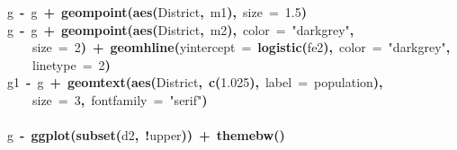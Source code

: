 \documentclass{article}
\makeatletter
\newcommand{\hlnumber}[1]{\textcolor[rgb]{0,0,0}{#1}}%
\newcommand{\hlfunctioncall}[1]{\textcolor[rgb]{.5,0,.33}{\textbf{#1}}}%
\newcommand{\hlstring}[1]{\textcolor[rgb]{.6,.6,1}{#1}}%
\newcommand{\hlkeyword}[1]{\textbf{#1}}%
\newcommand{\hlargument}[1]{\textcolor[rgb]{.69,.25,.02}{#1}}%
\newcommand{\hlassignement}[1]{\textbf{#1}}%
\newcommand{\hlsymbol}[1]{#1}%
\newcommand{\hlstd}[1]{\textcolor[rgb]{0,0,0}{#1}}%
\newenvironment{kframe}{%
 \def\FrameCommand##1{\hskip\@totalleftmargin \hskip-\fboxsep
 \colorbox{shadecolor}{##1}\hskip-\fboxsep
     \hskip-\linewidth \hskip-\@totalleftmargin \hskip\columnwidth}%
 \MakeFramed {\advance\hsize-\width
   \@totalleftmargin\z@ \linewidth\hsize
   \@setminipage}}%
 {\par\unskip\endMakeFramed}
\newenvironment{knitrout}{}{} %
\makeatother
\begin{document}
\begin{knitrout}
{\begin{kframe}
\begin{flushleft}
\hlstd{}\hlsymbol{g}{\ }\hlassignement{\usebox{\hlnormalsizeboxlessthan}-}{\ }\hlsymbol{g}{\ }\hlkeyword{+}{\ }\hlfunctioncall{geom\usebox{\hlnormalsizeboxunderscore}point}\hlkeyword{(}\hlfunctioncall{aes}\hlkeyword{(}\hlsymbol{District}\hlkeyword{,}{\ }\hlsymbol{m1}\hlkeyword{)}\hlkeyword{,}{\ }\hlargument{size}{\ }\hlargument{=}{\ }\hlnumber{1.5}\hlkeyword{)}\hspace*{\fill}\\
\hlstd{}\hlsymbol{g}{\ }\hlassignement{\usebox{\hlnormalsizeboxlessthan}-}{\ }\hlsymbol{g}{\ }\hlkeyword{+}{\ }\hlfunctioncall{geom\usebox{\hlnormalsizeboxunderscore}point}\hlkeyword{(}\hlfunctioncall{aes}\hlkeyword{(}\hlsymbol{District}\hlkeyword{,}{\ }\hlsymbol{m2}\hlkeyword{)}\hlkeyword{,}{\ }\hlargument{color}{\ }\hlargument{=}{\ }\hlstring{"darkgrey"}\hlkeyword{,}\hspace*{\fill}\\
\hlstd{}{\ }{\ }{\ }{\ }\hlargument{size}{\ }\hlargument{=}{\ }\hlnumber{2}\hlkeyword{)}{\ }\hlkeyword{+}{\ }\hlfunctioncall{geom\usebox{\hlnormalsizeboxunderscore}hline}\hlkeyword{(}\hlargument{yintercept}{\ }\hlargument{=}{\ }\hlfunctioncall{logistic}\hlkeyword{(}\hlsymbol{fe2}\hlkeyword{)}\hlkeyword{,}{\ }\hlargument{color}{\ }\hlargument{=}{\ }\hlstring{"darkgrey"}\hlkeyword{,}\hspace*{\fill}\\
\hlstd{}{\ }{\ }{\ }{\ }\hlargument{linetype}{\ }\hlargument{=}{\ }\hlnumber{2}\hlkeyword{)}\hspace*{\fill}\\
\hlstd{}\hlsymbol{g1}{\ }\hlassignement{\usebox{\hlnormalsizeboxlessthan}-}{\ }\hlsymbol{g}{\ }\hlkeyword{+}{\ }\hlfunctioncall{geom\usebox{\hlnormalsizeboxunderscore}text}\hlkeyword{(}\hlfunctioncall{aes}\hlkeyword{(}\hlsymbol{District}\hlkeyword{,}{\ }\hlfunctioncall{c}\hlkeyword{(}\hlnumber{1.025}\hlkeyword{)}\hlkeyword{,}{\ }\hlargument{label}{\ }\hlargument{=}{\ }\hlsymbol{population}\hlkeyword{)}\hlkeyword{,}\hspace*{\fill}\\
\hlstd{}{\ }{\ }{\ }{\ }\hlargument{size}{\ }\hlargument{=}{\ }\hlnumber{3}\hlkeyword{,}{\ }\hlargument{fontfamily}{\ }\hlargument{=}{\ }\hlstring{"serif"}\hlkeyword{)}\hspace*{\fill}\\
\hlstd{}\hspace*{\fill}\\
\hlstd{}\hlsymbol{g}{\ }\hlassignement{\usebox{\hlnormalsizeboxlessthan}-}{\ }\hlfunctioncall{ggplot}\hlkeyword{(}\hlfunctioncall{subset}\hlkeyword{(}\hlsymbol{d2}\hlkeyword{,}{\ }\hlkeyword{!}\hlsymbol{upper}\hlkeyword{)}\hlkeyword{)}{\ }\hlkeyword{+}{\ }\hlfunctioncall{theme\usebox{\hlnormalsizeboxunderscore}bw}\hlkeyword{(}\hlkeyword{)}\hspace*{\fill}\\

\end{flushleft}
\end{kframe}}
\end{knitrout}
\end{document}
